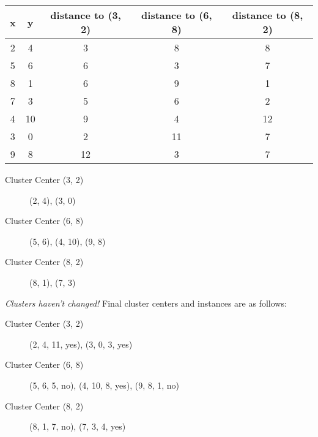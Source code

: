 \documentclass[12pt]{scrartcl}
\begin{document}
\begin{table}[H]
    \centering
    \begin{tabular}{|c|c|c|c|c|}
        \hline
        x & y  & distance to (3, 2) & distance to (6, 8) & distance to (8, 2) \\\hline
        2 & 4  & 3                  & 8                  & 8 \\
        5 & 6  & 6                  & 3                  & 7 \\
        8 & 1  & 6                  & 9                  & 1 \\
        7 & 3  & 5                  & 6                  & 2 \\
        4 & 10 & 9                  & 4                  & 12 \\
        3 & 0  & 2                  & 11                 & 7 \\
        9 & 8  & 12                 & 3                  & 7 \\
        \hline
    \end{tabular}
\end{table}

\begin{description}
    \item[Cluster Center (3, 2)] (2, 4), (3, 0)
    \item[Cluster Center (6, 8)] (5, 6), (4, 10), (9, 8)
    \item[Cluster Center (8, 2)] (8, 1), (7, 3)
\end{description}

\textit{Clusters haven't changed!} Final cluster centers and instances are as follows:

\begin{description}
    \item[Cluster Center (3, 2)] (2, 4, 11, yes), (3, 0, 3, yes)
    \item[Cluster Center (6, 8)] (5, 6, 5, no), (4, 10, 8, yes), (9, 8, 1, no)
    \item[Cluster Center (8, 2)] (8, 1, 7, no), (7, 3, 4, yes)
\end{description}
\end{document}
